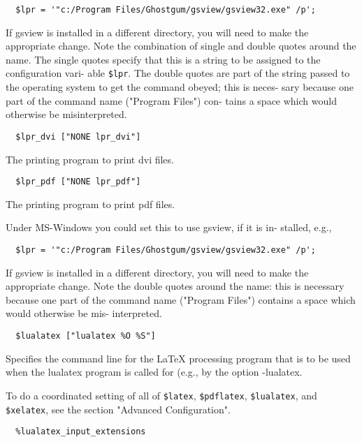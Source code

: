 \begin{verbatim}
  $lpr = '"c:/Program Files/Ghostgum/gsview/gsview32.exe" /p';
\end{verbatim}

If gsview is installed in a different directory, you  will  need
to  make the appropriate change.  Note the combination of single
and double quotes around the name.  The  single  quotes  specify
that  this is a string to be assigned to the configuration vari-
able \verb|$lpr|.  The double quotes are part of the string  passed  to
the  operating  system to get the command obeyed; this is neces-
sary because one part of the command name ("Program Files") con-
tains a space which would otherwise be misinterpreted.

\begin{verbatim}
  $lpr_dvi ["NONE lpr_dvi"]
\end{verbatim}

The printing program to print dvi files.

\begin{verbatim}
  $lpr_pdf ["NONE lpr_pdf"]
\end{verbatim}
       
The printing program to print pdf files.

Under  MS-Windows you could set this to use gsview, if it is in-
stalled, e.g.,

\begin{verbatim}
  $lpr = '"c:/Program Files/Ghostgum/gsview/gsview32.exe" /p';
\end{verbatim}

If gsview is installed in a different directory, you  will  need
to  make  the appropriate change.  Note the double quotes around
the name: this is necessary because one part of the command name
("Program Files") contains a space which would otherwise be mis-
interpreted.

\begin{verbatim}
  $lualatex ["lualatex %O %S"]
\end{verbatim}

Specifies the command line for the LaTeX processing program that
is  to be used when the lualatex program is called for (e.g., by
the option -lualatex.

To do a coordinated setting of all of \verb|$latex|, 
\verb|$pdflatex|, \verb|$lualatex|, and \verb|$xelatex|, see the section "Advanced Configuration".

\begin{verbatim}
  %lualatex_input_extensions
\end{verbatim}

